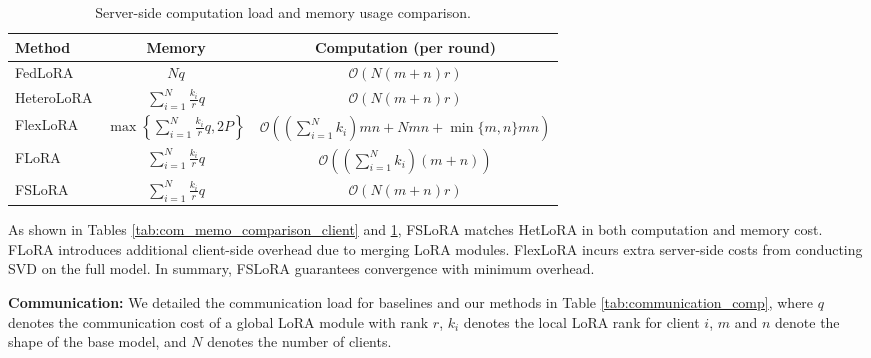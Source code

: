 \documentclass{article} %
\theoremstyle{plain}
\theoremstyle{definition}
\begin{document}
\begin{table}[H]
\caption{
Server-side computation load and memory usage comparison.
}
\label{tab:com_memo_comparison_server}
\centering
\begin{tabular}{@{}lcc@{}}
\toprule
{Method} & {Memory} & {Computation (per round)} \\
\midrule
FedLoRA &
$N q$ &
$\mathcal{O}(N(m + n) r)$ \\
{HeteroLoRA} &
$\sum_{i=1}^N \frac{k_i}{r}q$ &
$\mathcal{O}(N(m + n)r)$ \\
{FlexLoRA} &
$\max\left\{\sum_{i=1}^N \frac{k_i}{r}q, 2P\right\}$ &
$\mathcal{O}\left((\sum_{i=1}^N k_i)mn + Nmn + \min\{m,n\}mn \right)$ \\
{FLoRA} &
$\sum_{i=1}^N \frac{k_i}{r}q$ &
$\mathcal{O}\left((\sum_{i=1}^N k_i)(m + n)\right)$ \\
 {FSLoRA} &
$\sum_{i=1}^N \frac{k_i}{r}q$ &
$\mathcal{O}(N(m + n)r)$ \\
\bottomrule
\end{tabular}
\vspace{-3mm}
\end{table}

As shown in Tables  \ref{tab:com_memo_comparison_client} and \ref{tab:com_memo_comparison_server}, FSLoRA matches HetLoRA in both computation and memory cost. FLoRA introduces additional client-side overhead due to merging LoRA modules. FlexLoRA incurs extra server-side costs from conducting SVD on the full model. In summary, FSLoRA guarantees convergence with minimum overhead.

\textbf{Communication:}
We detailed the communication load for baselines and our methods in Table \ref{tab:communication_comp}, where $q$ denotes the communication cost of a global LoRA module with rank $r$, $k_i$ denotes the local LoRA rank for client $i$, $m$ and $n$ denote the shape of the base model, and $N$ denotes the number of clients.
\end{document}
